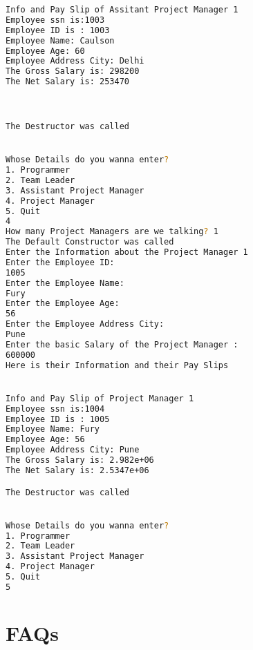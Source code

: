 \documentclass[11pt]{article}
\begin{document}
\begin{lstlisting}[language=bash, caption=C++ Output]
Info and Pay Slip of Assitant Project Manager 1
Employee ssn is:1003
Employee ID is : 1003
Employee Name: Caulson
Employee Age: 60
Employee Address City: Delhi
The Gross Salary is: 298200
The Net Salary is: 253470



The Destructor was called


Whose Details do you wanna enter?
1. Programmer
2. Team Leader
3. Assistant Project Manager
4. Project Manager
5. Quit
4
How many Project Managers are we talking? 1
The Default Constructor was called
Enter the Information about the Project Manager 1
Enter the Employee ID:
1005
Enter the Employee Name:
Fury
Enter the Employee Age:
56
Enter the Employee Address City:
Pune
Enter the basic Salary of the Project Manager :
600000
Here is their Information and their Pay Slips


Info and Pay Slip of Project Manager 1
Employee ssn is:1004
Employee ID is : 1005
Employee Name: Fury
Employee Age: 56
Employee Address City: Pune
The Gross Salary is: 2.982e+06
The Net Salary is: 2.5347e+06

The Destructor was called


Whose Details do you wanna enter?
1. Programmer
2. Team Leader
3. Assistant Project Manager
4. Project Manager
5. Quit
5
\end{lstlisting}

\pagebreak

\section{FAQs}
\end{document}
